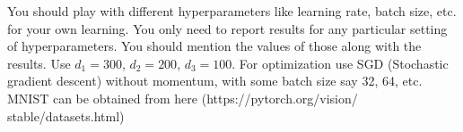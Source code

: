 \documentclass[a4paper]{article}
\theoremstyle{definition}
\begin{document}
You should play with different hyperparameters like learning rate, batch size, etc. for your own learning. You only need to report results for any particular setting of hyperparameters. You should mention the values of those along with the results. Use $d_1 = 300$, $d_2 = 200$, $d_3 = 100$. For optimization use SGD (Stochastic gradient descent) without momentum, with some batch size say 32, 64, etc. MNIST can be obtained from here (https://pytorch.org/vision/ stable/datasets.html)


\end{document}
